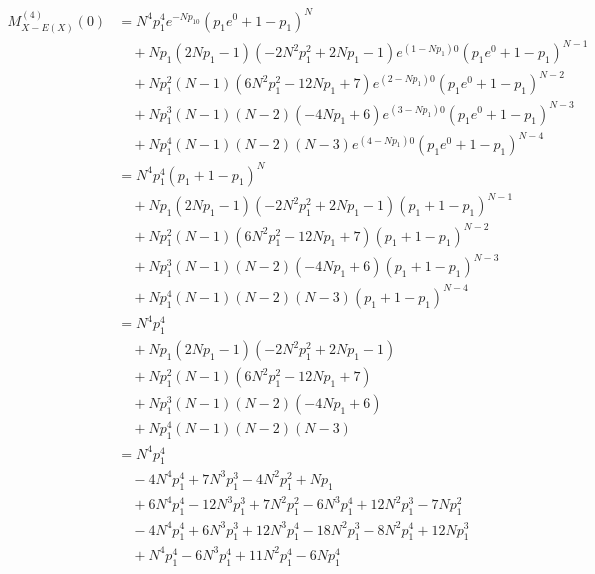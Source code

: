 \documentclass[dvipdfmx]{jsarticle}
\begin{document}
 \begin{align}
  M_{X-E\left(X\right)}^{\left(4\right)}\left(0\right)&=N^4p_1^4e^{-Np_10}\left(p_1e^0+1-p_1\right)^N\nonumber\\
  &\quad+Np_1\left(2Np_1-1\right)\left(-2N^2p_1^2+2Np_1-1\right)e^{\left(1-Np_1\right)0}\left(p_1e^0+1-p_1\right)^{N-1}\nonumber\\
  &\quad+Np_1^2\left(N-1\right)\left(6N^2p_1^2-12Np_1+7\right)e^{\left(2-Np_1\right)0}\left(p_1e^0+1-p_1\right)^{N-2}\nonumber\\
  &\quad+Np_1^3\left(N-1\right)\left(N-2\right)\left(-4Np_1+6\right)e^{\left(3-Np_1\right)0}\left(p_1e^0+1-p_1\right)^{N-3}\nonumber\\
  &\quad+Np_1^4\left(N-1\right)\left(N-2\right)\left(N-3\right)e^{\left(4-Np_1\right)0}\left(p_1e^0+1-p_1\right)^{N-4}\nonumber\\
  &=N^4p_1^4\left(p_1+1-p_1\right)^N\nonumber\\
  &\quad+Np_1\left(2Np_1-1\right)\left(-2N^2p_1^2+2Np_1-1\right)\left(p_1+1-p_1\right)^{N-1}\nonumber\\
  &\quad+Np_1^2\left(N-1\right)\left(6N^2p_1^2-12Np_1+7\right)\left(p_1+1-p_1\right)^{N-2}\nonumber\\
  &\quad+Np_1^3\left(N-1\right)\left(N-2\right)\left(-4Np_1+6\right)\left(p_1+1-p_1\right)^{N-3}\nonumber\\
  &\quad+Np_1^4\left(N-1\right)\left(N-2\right)\left(N-3\right)\left(p_1+1-p_1\right)^{N-4}\nonumber\\
  &=N^4p_1^4\nonumber\\
  &\quad+Np_1\left(2Np_1-1\right)\left(-2N^2p_1^2+2Np_1-1\right)\nonumber\\
  &\quad+Np_1^2\left(N-1\right)\left(6N^2p_1^2-12Np_1+7\right)\nonumber\\
  &\quad+Np_1^3\left(N-1\right)\left(N-2\right)\left(-4Np_1+6\right)\nonumber\\
  &\quad+Np_1^4\left(N-1\right)\left(N-2\right)\left(N-3\right)\nonumber\\
  &=N^4p_1^4\nonumber\\
  &\quad-4N^4p_1^4+7N^3p_1^3-4N^2p_1^2+Np_1\nonumber\\
  &\quad+6N^4p_1^4-12N^3p_1^3+7N^2p_1^2-6N^3p_1^4+12N^2p_1^3-7Np_1^2\nonumber\\
  &\quad-4N^4p_1^4+6N^3p_1^3+12N^3p_1^4-18N^2p_1^3-8N^2p_1^4+12Np_1^3\nonumber\\
  &\quad+N^4p_1^4-6N^3p_1^4+11N^2p_1^4-6Np_1^4\nonumber\\
 \end{align}
\end{document}
